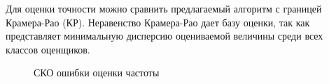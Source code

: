 Для оценки точности можно сравнить предлагаемый алгоритм с границей Крамера-Рао (КР). Неравенство Крамера-Рао дает базу оценки, так
как представляет минимальную дисперсию оцениваемой величины среди всех классов оценщиков.
\begin{figure}[H]
\center{}
	\caption{СКО ошибки оценки частоты}
	\label{pic:crlb_vs_1sat_algo}
\end{figure}
